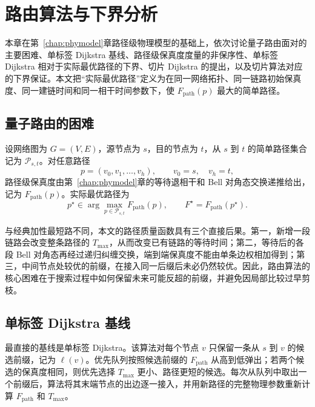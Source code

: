 %
%

\chapter{路由算法与下界分析}
\label{chap:nonisotonic}

本章在第~\ref{chap:phymodel}章路径级物理模型的基础上，依次讨论量子路由面对的主要困难、单标签 Dijkstra 基线、路径级保真度度量的非保序性、单标签 Dijkstra 相对于实际最优路径的下界、切片 Dijkstra 的提出，以及切片算法对应的下界保证。本文把“实际最优路径”定义为在同一网络拓扑、同一链路初始保真度、同一建链时间和同一相干时间参数下，使 $F_{\mathrm{path}}(p)$ 最大的简单路径。

\section{量子路由的困难}
\label{sec:quantum-routing-difficulty}

设网络图为 $G=(V,E)$，源节点为 $s$，目的节点为 $t$，从 $s$ 到 $t$ 的简单路径集合记为 $\mathcal{P}_{s,t}$。对任意路径
\[
p=(v_0,v_1,\ldots,v_h),
\qquad v_0=s,\quad v_h=t,
\]
路径级保真度由第~\ref{chap:phymodel}章的等待退相干和 Bell 对角态交换递推给出，记为 $F_{\mathrm{path}}(p)$。实际最优路径为
\begin{equation}
  p^\star
  \in
  \arg\max_{p\in\mathcal{P}_{s,t}} F_{\mathrm{path}}(p),
  \qquad
  F^\star = F_{\mathrm{path}}(p^\star).
  \label{eq:actual-optimal-path}
\end{equation}

与经典加性最短路不同，本文的路径质量函数具有三个直接后果。第一，新增一段链路会改变整条路径的 $T_{\max}$，从而改变已有链路的等待时间；第二，等待后的各段 Bell 对角态再经过递归纠缠交换，端到端保真度不能由单条边权相加得到；第三，中间节点处较优的前缀，在接入同一后缀后未必仍然较优。因此，路由算法的核心困难在于搜索过程中如何保留未来可能反超的前缀，并避免因局部比较过早剪枝。

\section{单标签 Dijkstra 基线}
\label{sec:dijkstra-baseline}

最直接的基线是单标签 Dijkstra。该算法对每个节点 $v$ 只保留一条从 $s$ 到 $v$ 的候选前缀，记为 $\ell(v)$。优先队列按照候选前缀的 $F_{\mathrm{path}}$ 从高到低弹出；若两个候选的保真度相同，则优先选择 $T_{\max}$ 更小、路径更短的候选。每次从队列中取出一个前缀后，算法将其末端节点的出边逐一接入，并用新路径的完整物理参数重新计算 $F_{\mathrm{path}}$ 和 $T_{\max}$。


